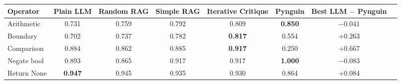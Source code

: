 \begin{tabular}{@{}lccccccc@{}}
\toprule
Operator & Plain LLM & Random RAG & Simple RAG & Iterative Critique & Pynguin & Best LLM $-$ Pynguin \\
\midrule
Arithmetic & 0.731 & 0.759 & 0.792 & 0.809 & \textbf{0.850} & $-0.041$ \\
Boundary & 0.702 & 0.737 & 0.782 & \textbf{0.817} & 0.554 & $+0.263$ \\
Comparison & 0.884 & 0.862 & 0.885 & \textbf{0.917} & 0.250 & $+0.667$ \\
Negate bool & 0.893 & 0.865 & 0.917 & 0.917 & \textbf{1.000} & $-0.083$ \\
Return None & \textbf{0.947} & 0.945 & 0.935 & 0.930 & 0.864 & $+0.084$ \\
\bottomrule
\end{tabular}
